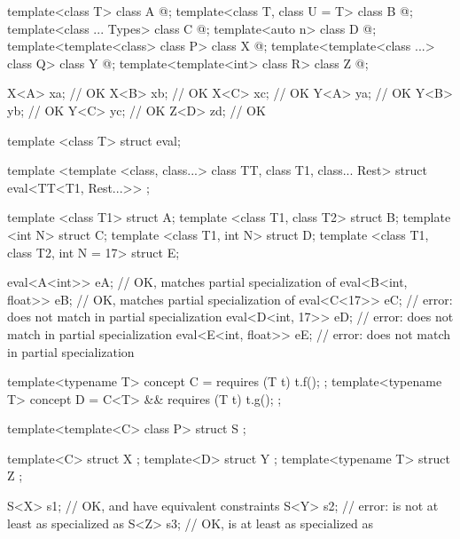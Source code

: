 \begin{example}
\begin{codeblock}
template<class T> class A { @\commentellip@ };
template<class T, class U = T> class B { @\commentellip@ };
template<class ... Types> class C { @\commentellip@ };
template<auto n> class D { @\commentellip@ };
template<template<class> class P> class X { @\commentellip@ };
template<template<class ...> class Q> class Y { @\commentellip@ };
template<template<int> class R> class Z { @\commentellip@ };

X<A> xa;            // OK
X<B> xb;            // OK
X<C> xc;            // OK
Y<A> ya;            // OK
Y<B> yb;            // OK
Y<C> yc;            // OK
Z<D> zd;            // OK
\end{codeblock}
\end{example}
\begin{example}
\begin{codeblock}
template <class T> struct eval;

template <template <class, class...> class TT, class T1, class... Rest>
struct eval<TT<T1, Rest...>> { };

template <class T1> struct A;
template <class T1, class T2> struct B;
template <int N> struct C;
template <class T1, int N> struct D;
template <class T1, class T2, int N = 17> struct E;

eval<A<int>> eA;                // OK, matches partial specialization of 
eval<B<int, float>> eB;         // OK, matches partial specialization of 
eval<C<17>> eC;                 // error:  does not match  in partial specialization
eval<D<int, 17>> eD;            // error:  does not match  in partial specialization
eval<E<int, float>> eE;         // error:  does not match  in partial specialization
\end{codeblock}
\end{example}
\begin{example}
\begin{codeblock}
template<typename T> concept C = requires (T t) { t.f(); };
template<typename T> concept D = C<T> && requires (T t) { t.g(); };

template<template<C> class P> struct S { };

template<C> struct X { };
template<D> struct Y { };
template<typename T> struct Z { };

S<X> s1;            // OK,  and  have equivalent constraints
S<Y> s2;            // error:  is not at least as specialized as 
S<Z> s3;            // OK,  is at least as specialized as 
\end{codeblock}
\end{example}

